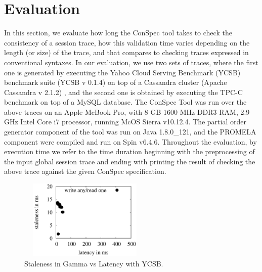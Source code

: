 \documentclass[conference]{IEEEtran}
\begin{document}
	\section{Evaluation}\label{sec:eval}
	In this section, we evaluate how long the ConSpec tool takes to check the consistency of a  session trace, how this validation time varies depending on the length (or size) of the trace, and that compares to checking traces expressed in conventional syntaxes. In our evaluation, we use two sets of traces, where the first one is generated by executing the Yahoo Cloud Serving Benchmark (YCSB) benchmark suite (YCSB v 0.1.4)  \cite{Cooper:2010:BCS:1807128.1807152}   on top of a Cassandra cluster (Apache Cassandra v 2.1.2)  \cite{Lakshman:2010:CDS:1773912.1773922}, and the second one is obtained by executing the TPC-C benchmark on top of a MySQL database.
	The ConSpec Tool was run over the above traces on an Apple McBook Pro, with 8 GB 1600 MHz DDR3 RAM,  2.9 GHz Intel Core i7 processor, %
	running McOS Sierra v10.12.4. The partial order generator component of the tool was run on Java 1.8.0\_121, and the PROMELA component were  compiled and run on Spin v6.4.6.
	Throughout the evaluation, by execution time we refer to the time duration beginning with the preprocessing of the input global session trace and ending with printing the result of checking the above  trace against the given ConSpec specification.
	\begin{figure}%
		\includegraphics[width=2.5in,height=1.5in]
		{oneany.eps} %
		\caption{Staleness in Gamma vs Latency with YCSB.}
		\label{fig:oneany}
	\end{figure}
	
\end{document}
